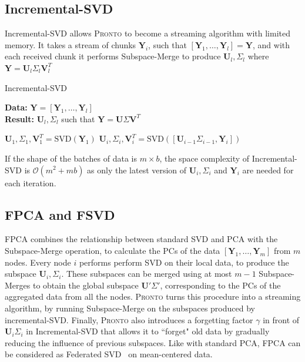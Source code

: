 \subsection{Incremental-SVD}
Incremental-SVD allows \textsc{Pronto} to become a streaming algorithm with limited
memory. It takes a stream of chunks $\mathbf{Y}_i$, such that  $[\mathbf{Y}_1,
\ldots, \mathbf{Y}_l] = \mathbf{Y}$, and with each received chunk it performs
Subspace-Merge to produce $\mathbf{U}_l, \Sigma_l$ where $\mathbf{Y} =
\mathbf{U}_l\Sigma_l\mathbf{V}_l^T$

\begin{algorithm}
\caption{Incremental-SVD}
\textbf{Data:} $\mathbf{Y} = [\mathbf{Y}_1, \dots, \mathbf{Y}_l]$ \\
    \textbf{Result:} $\mathbf{U}_l, \Sigma_l$ such that $\mathbf{Y} =
    \mathbf{U}\Sigma\mathbf{V}^T$
\begin{algorithmic}
\State $\mathbf{U}_1, \Sigma_1, \mathbf{V}_1^T = \text{SVD}(\mathbf{Y}_1)$
\State $\mathbf{U}_i, \Sigma_i, \mathbf{V}_i^T = \text{SVD}([\mathbf{U}_{i-1}\Sigma_{i-1}, \mathbf{Y}_i])$
\EndFor
\end{algorithmic}
\end{algorithm}
If the shape of the batches of data is $m \times b$, the space complexity of
Incremental-SVD is $\mathcal{O}(m^2 + mb)$ as only the latest version of
$\mathbf{U}_i,\Sigma_i$ and $\mathbf{Y}_i$ are needed for each iteration.

\subsection{FPCA and FSVD}
FPCA combines the relationship between standard SVD and PCA with the
Subspace-Merge operation, to calculate the PCs of the data $[\mathbf{Y}_1,
\ldots,\mathbf{Y}_m]$ from $m$ nodes. Every node $i$ performs perform SVD  on
their local data, to produce the subspace $\mathbf{U}_i, \Sigma_i$. These
subspaces can be merged using at most $m-1$ Subspace-Merges to obtain the global
subspace $\mathbf{U}'\Sigma'$, corresponding to the PCs of the aggregated data
from all the nodes. \textsc{Pronto} turns this procedure into a streaming algorithm, by
running Subspace-Merge on the subspaces produced by incremental-SVD. Finally,
\textsc{Pronto} also introduces a forgetting factor $\gamma$ in front of
$\mathbf{U}_i\Sigma_i$ in Incremental-SVD that allows it to ``forget" old data
by gradually reducing the influence of previous subspaces. Like with standard
PCA, FPCA can be considered as Federated SVD~\cite{grammenos2020federated} on
mean-centered data.

